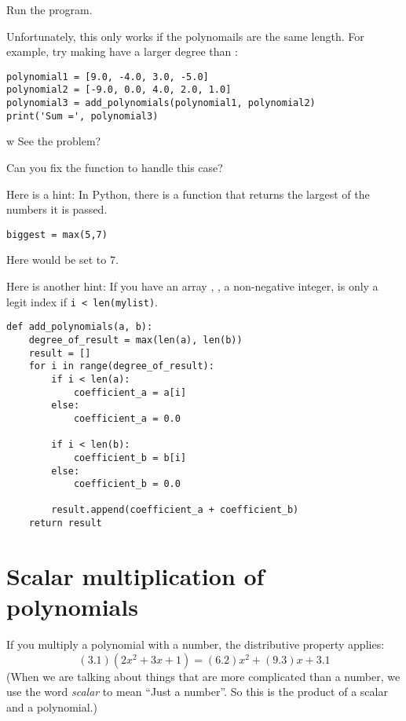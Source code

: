 Run the program.

Unfortunately, this only works if the polynomails are the same length. For
example, try making  have a larger degree than
:
\begin{Verbatim}
polynomial1 = [9.0, -4.0, 3.0, -5.0]
polynomial2 = [-9.0, 0.0, 4.0, 2.0, 1.0]
polynomial3 = add_polynomials(polynomial1, polynomial2)
print('Sum =', polynomial3)
\end{Verbatim}
w
See the problem?

\begin{Exercise}[title=Dealing with polynomials of different degrees, label=pyaddpolys]
  
Can you fix the function  to handle this case?

Here is a hint: In Python, there is a  function that returns the largest of the numbers it is passed.
\begin{Verbatim}
biggest = max(5,7)
\end{Verbatim}
Here  would be set to 7.

Here is another hint: If you have an array , ,
a non-negative integer, is only a legit index if \texttt{i <
  len(mylist)}.
\end{Exercise}
\begin{Answer}[ref=pyaddpolys]
\begin{Verbatim}
def add_polynomials(a, b):
    degree_of_result = max(len(a), len(b))
    result = []
    for i in range(degree_of_result):
        if i < len(a):
            coefficient_a = a[i]
        else:
            coefficient_a = 0.0   

        if i < len(b):
            coefficient_b = b[i]
        else:
            coefficient_b = 0.0
            
        result.append(coefficient_a + coefficient_b)
    return result
\end{Verbatim}
\end{Answer}

\section{Scalar multiplication of  polynomials}

If you multiply a polynomial with a number, the distributive property applies:
\begin{equation*}
  (3.1)(2x^2 + 3x + 1) = (6.2)x^2 + (9.3)x + 3.1
\end{equation*}
(When we are talking about things that are more complicated than a number, we use the word \emph{scalar} to mean ``Just a number''. So this is the product of a scalar and a polynomial.)

